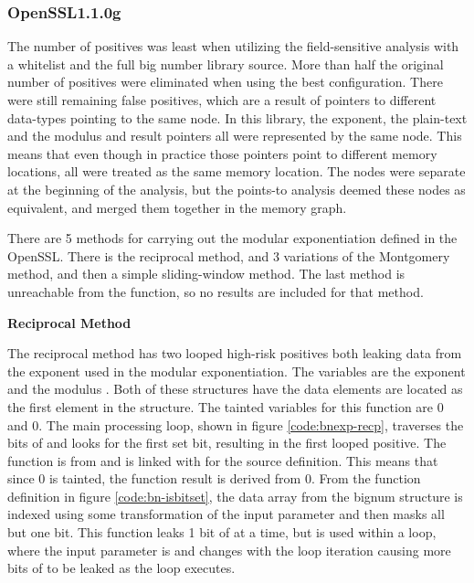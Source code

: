 \subsubsection{OpenSSL1.1.0g}

     The number of positives was least when utilizing the field-sensitive
     analysis with a whitelist and the full big number library source. More than
     half the original number of positives were eliminated when using the best
     configuration. There were still remaining false positives, which are a
     result of pointers to different data-types pointing to the same node. In
     this library, the exponent, the plain-text and the modulus and result
     pointers all were represented by the same node. This means that even though
     in practice those pointers point to different memory locations, all were
     treated as the same memory location. The nodes were separate at the
     beginning of the analysis, but the points-to analysis deemed these nodes as
     equivalent, and merged them together in the memory graph.

     There are 5 methods for carrying out the modular exponentiation defined in
     the OpenSSL. There is the reciprocal method, and 3 variations of the
     Montgomery method, and then a simple sliding-window method. The last method
     is unreachable from the  function, so no results are included for
     that method.


\noindent
\textbf{Reciprocal Method}

The reciprocal method has two looped high-risk positives both leaking data
  from the exponent used in the modular exponentiation. The variables are the
  exponent  and the modulus . Both of these structures have
  the data elements are located as the first element in the structure. The tainted
  variables for this function are  0 and  0. The main
  processing loop, shown in figure \ref{code:bnexp-recp}, traverses the bits of
   and looks for the first set bit, resulting in the first looped
  positive. The function  is from 
  and is linked with  for the source definition. This means
  that since  0 is tainted, the  function
  result is derived from  0. From the function definition in figure
  \ref{code:bn-isbitset}, the data array from the bignum structure is indexed
  using some transformation of the input parameter  and then masks all
  but one bit. This function leaks 1 bit of  at a time, but is used
  within a loop, where the input parameter is  and changes with
  the loop iteration causing more bits of  to be leaked as the loop
  executes.

